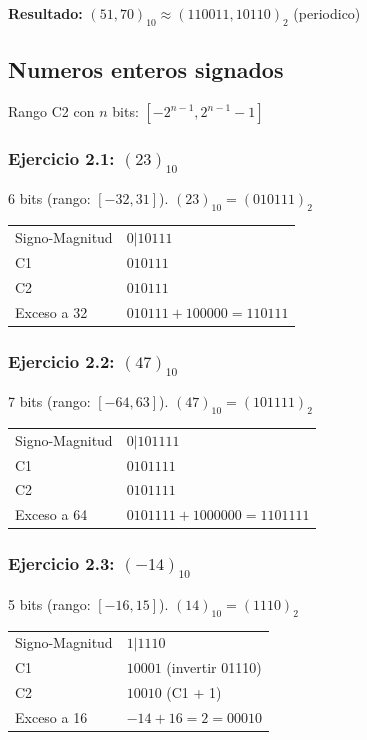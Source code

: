 \documentclass[12pt,a4paper]{article}
\begin{document}
\vspace{0.3cm}
\textbf{Resultado:} $(51,70)_{10} \approx (110011,10110)_2$ (periodico)

\subsection{Numeros enteros signados}

Rango C2 con $n$ bits: $[-2^{n-1}, 2^{n-1}-1]$

\subsubsection{Ejercicio 2.1: $(23)_{10}$}

6 bits (rango: $[-32, 31]$). $(23)_{10} = (010111)_2$

\begin{tabular}{ll}
Signo-Magnitud & $0|10111$ \\
C1 & $010111$ \\
C2 & $010111$ \\
Exceso a 32 & $010111 + 100000 = 110111$
\end{tabular}

\subsubsection{Ejercicio 2.2: $(47)_{10}$}

7 bits (rango: $[-64, 63]$). $(47)_{10} = (101111)_2$

\begin{tabular}{ll}
Signo-Magnitud & $0|101111$ \\
C1 & $0101111$ \\
C2 & $0101111$ \\
Exceso a 64 & $0101111 + 1000000 = 1101111$
\end{tabular}

\subsubsection{Ejercicio 2.3: $(-14)_{10}$}

5 bits (rango: $[-16, 15]$). $(14)_{10} = (1110)_2$

\begin{tabular}{ll}
Signo-Magnitud & $1|1110$ \\
C1 & $10001$ (invertir 01110) \\
C2 & $10010$ (C1 + 1) \\
Exceso a 16 & $-14 + 16 = 2 = 00010$
\end{tabular}
\end{document}
